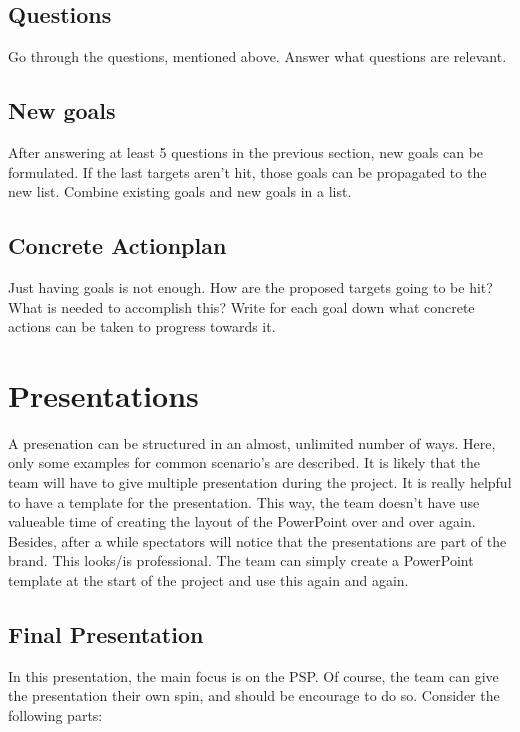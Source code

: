\documentclass[10pt]{report}
\begin{document}
\subsection{Questions}

Go through the questions, mentioned above. Answer what questions are relevant.

\subsection{New goals}

After answering at least 5 questions in the previous section, new goals can be formulated. If the last targets aren't hit, those goals can be propagated to the new list. Combine existing goals and new goals in a list.

\subsection{Concrete Actionplan}

Just having goals is not enough. How are the proposed targets going to be hit? What is needed to accomplish this? Write for each goal down what concrete actions can be taken to progress towards it.

\newpage

\section{Presentations}

A presenation can be structured in an almost, unlimited number of ways. Here, only some examples for common scenario's are described. It is likely that the team will have to give multiple presentation during the project. It is really helpful to have a template for the presentation. This way, the team doesn't have use valueable time of creating the layout of the PowerPoint over and over again. Besides, after a while spectators will notice that the presentations are part of the brand. This looks/is professional. The team can simply create a PowerPoint template at the start of the project and use this again and again.

\subsection{Final Presentation}

In this presentation, the main focus is on the PSP. Of course, the team can give the presentation their own spin, and should be encourage to do so. Consider the following parts:
\end{document}
